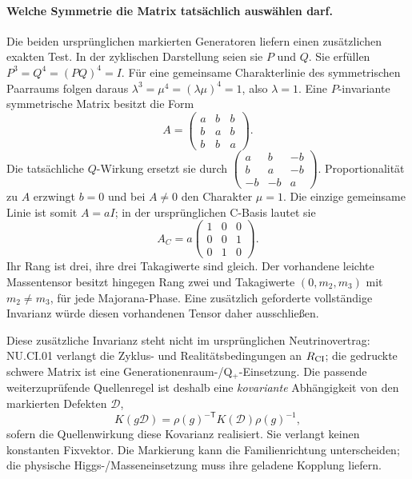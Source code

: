 \paragraph{Welche Symmetrie die Matrix tatsächlich auswählen darf.}
Die beiden ursprünglichen markierten Generatoren liefern einen zusätzlichen
exakten Test. In der zyklischen Darstellung seien sie $P$ und $Q$.
Sie erfüllen $P^3=Q^4=(PQ)^4=I$.
Für eine gemeinsame Charakterlinie des symmetrischen Paarraums folgen daraus
$\lambda^3=\mu^4=(\lambda\mu)^4=1$, also $\lambda=1$.
Eine $P$-invariante symmetrische Matrix besitzt die Form
\[
 A=\begin{pmatrix}a&b&b\\b&a&b\\b&b&a\end{pmatrix}.
\]
Die tatsächliche $Q$-Wirkung ersetzt sie durch
$\left(\begin{smallmatrix}a&b&-b\\b&a&-b\\-b&-b&a\end{smallmatrix}\right)$.
Proportionalität zu $A$ erzwingt $b=0$ und bei $A\ne0$ den Charakter $\mu=1$.
Die einzige gemeinsame Linie ist somit $A=aI$; in der ursprünglichen
C-Basis lautet sie
\[
 A_C=a\begin{pmatrix}1&0&0\\0&0&1\\0&1&0\end{pmatrix}.
\]
Ihr Rang ist drei, ihre drei Takagiwerte sind gleich.
Der vorhandene leichte Massentensor besitzt hingegen Rang zwei und
Takagiwerte $(0,m_2,m_3)$ mit $m_2\ne m_3$, für jede Majorana-Phase.
Eine zusätzlich geforderte vollständige Invarianz würde diesen vorhandenen
Tensor daher ausschließen.

Diese zusätzliche Invarianz steht nicht im ursprünglichen Neutrinovertrag:
NU.CI.01 verlangt die Zyklus- und Realitätsbedingungen an $R_{\rm CI}$;
die gedruckte schwere Matrix ist eine Generationenraum-/Q$_+$-Einsetzung.
Die passende weiterzuprüfende Quellenregel ist deshalb eine
\emph{kovariante} Abhängigkeit von den markierten Defekten $\mathcal D$,
\[
 K(g\mathcal D)=\rho(g)^{-\mathsf T}K(\mathcal D)\rho(g)^{-1},
\]
sofern die Quellenwirkung diese Kovarianz realisiert. Sie verlangt keinen
konstanten Fixvektor. Die Markierung kann die Familienrichtung unterscheiden;
die physische Higgs-/Masseneinsetzung muss ihre geladene Kopplung liefern.

